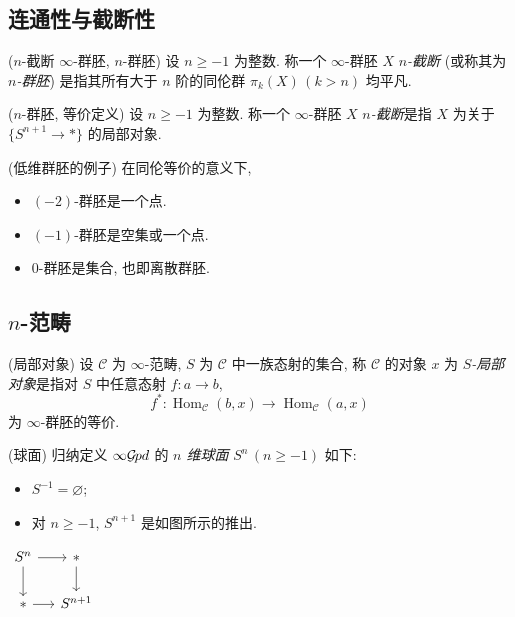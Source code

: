 \subsection{连通性与截断性}


\begin{definition}
	{($n$-截断 $\infty$-群胚, $n$-群胚)}
	设 $n\geq -1$ 为整数. 称一个 $\infty$-群胚 $X$  \emph{$n$-截断} (或称其为 \emph{$n$-群胚}) 是指其所有大于 $n$ 阶的同伦群 $\pi_k(X)\,(k>n)$ 均平凡.
\end{definition}

\begin{definition}
	{($n$-群胚, 等价定义)}
	设 $n\geq -1$ 为整数. 称一个 $\infty$-群胚 $X$  \emph{$n$-截断}是指 $X$ 为关于 $\{S^{n+1}\to *\}$ 的局部对象.
\end{definition}

\begin{example}
	{(低维群胚的例子)}
	在同伦等价的意义下,
	\begin{itemize}
		\item $(-2)$-群胚是一个点.
		\item $(-1)$-群胚是空集或一个点.
		\item $0$-群胚是集合, 也即离散群胚.
	\end{itemize}
\end{example}

\subsection{$n$-范畴}

\begin{definition}
	[label={local-objects-infinity-category}]
	{(局部对象)}
	设 $\mathcal C$ 为 $\infty$-范畴, $S$ 为 $\mathcal C$ 中一族态射的集合, 称 $\mathcal C$ 的对象 $x$ 为 \emph{$S$-局部对象}是指对 $S$ 中任意态射 $f\colon a\to b$,
	\[
	f^*\colon \operatorname{Hom}_{\mathcal C}(b,x) \to \operatorname{Hom}_{\mathcal C}(a,x)
	\]
	为 $\infty$-群胚的等价.
\end{definition}

\begin{definition}
	{(球面)}
	归纳定义 ${\infty\mathcal {G}\hspace{-1pt}pd}$ 的 \emph{$n$ 维球面} $S^n\,(n\geq -1)$ 如下:
	\begin{itemize}
		\item $S^{-1}=\varnothing$;
		\item 对 $n\geq -1$, $S^{n+1}$ 是如图所示的推出.
	\end{itemize}
	\vspace{-6.5em}
	\begin{flushright}
		$\begin{tikzcd}[ampersand replacement=\&,column sep=small]
			{S^{n}} \& {*} \\
			{*} \& {S^{n+1}}
			\arrow[from=1-1, to=2-1]
			\arrow[from=2-1, to=2-2]
			\arrow[from=1-1, to=1-2]
			\arrow[from=1-2, to=2-2]
		\end{tikzcd}$
	\end{flushright}
\end{definition}

